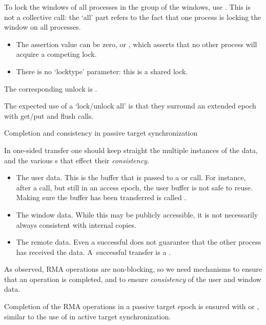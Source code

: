 To lock the windows of all processes in the group of the windows, use
. This is not a collective call:
the `all' part refers to the fact that one process is locking the
window on all processes.
\begin{itemize}
\item
  The assertion value can be zero, or ,
  which asserts that no other process will acquire a competing lock.
\item There is no `locktype' parameter: this is a shared lock.
\end{itemize}

The corresponding unlock is
.

The expected use of a `lock/unlock all' is that they surround
an extended epoch with get/put and flush calls.

 {Completion and consistency in passive target synchronization}

In one-sided transfer one should keep straight the multiple instances
of the data, and the various s that effect
their \emph{consistency}.
\begin{itemize}
\item The user data. This is the buffer that is passed to a  or
   call. For instance, after a  call, but still in an
  access epoch, the user buffer is not safe to reuse. Making sure the
  buffer has been transferred is called .
\item The window data. While this may be publicly accessible, it is
  not necessarily always consistent with internal copies.
\item The remote data. Even a successful  does not guarantee
  that the other process has received the data. A~successful transfer
  is a .
\end{itemize}

As observed, \ac{RMA} operations are non-blocking, so we need
mechanisms to ensure that an operation is completed,
and to ensure \emph{consistency} of the
user and window data.

Completion of the \ac{RMA} operations in a  passive target epoch
is ensured with
 or ,
similar to the use of 
in active target synchronization.

